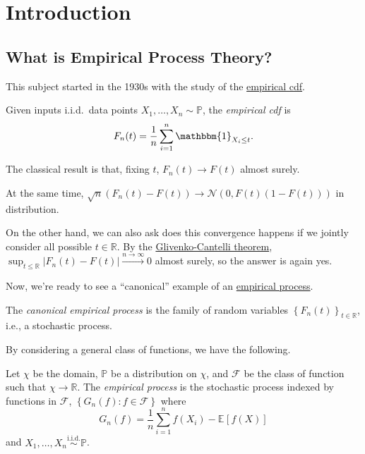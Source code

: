 \chapter{Introduction}
\section{What is Empirical Process Theory?}
This subject started in the 1930s with the study of the \hyperref[def:empirical-cdf]{empirical cdf}.

\begin{definition}\label{def:empirical-cdf}
	Given inputs i.i.d.\ data points \(X_1, \dots , X_n \sim \mathbb{P} \), the \emph{empirical cdf} is
	\[
		F_n(t) = \frac{1}{n} \sum_{i=1}^{n} \mathbbm{1}_{X_i \leq t} .
	\]
\end{definition}

The classical result is that, fixing \(t\), \(F_n(t) \to F(t)\) almost surely.

\begin{note}
	At the same time, \(\sqrt{n} (F_n(t) - F(t)) \to \mathcal{N} (0, F(t)(1 - F(t)))\) in distribution.
\end{note}

On the other hand, we can also ask does this convergence happens if we jointly consider all possible \(t\in \mathbb{R} \). By the \href{https://en.wikipedia.org/wiki/Glivenko-Cantelli_theorem}{Glivenko-Cantelli theorem}, \(\sup _{t \leq\mathbb{R} } \vert F_n(t) - F(t) \vert \overset{n \to \infty }{\to } 0\) almost surely, so the answer is again yes.

Now, we're ready to see a ``canonical'' example of an \hyperref[def:EP]{empirical process}.

\begin{eg}
	The \emph{canonical empirical process} is the family of random variables \(\left\{ F_n(t) \right\}_{t\in \mathbb{R} } \), i.e., a stochastic process.
\end{eg}

By considering a general class of functions, we have the following.

\begin{definition}\label{def:EP}
	Let \(\chi \) be the domain, \(\mathbb{P} \) be a distribution on \(\chi \), and \(\mathscr{F} \) be the class of function such that \(\chi \to \mathbb{R} \). The \emph{empirical process} is the stochastic process indexed by functions in \(\mathscr{F} \), \(\left\{ G_n(f) \colon f\in \mathscr{F}  \right\} \) where
	\[
		G_n(f) = \frac{1}{n} \sum_{i=1}^{n} f(X_i) - \mathbb{E}_{}\left[f(X) \right]
	\]
	and \(X_1, \dots , X_n \overset{\text{i.i.d.} }{\sim } \mathbb{P} \).
\end{definition}

